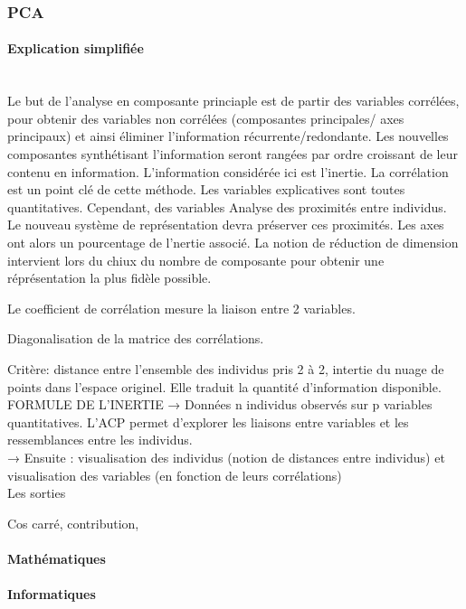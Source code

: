 \documentclass[12pt]{article}
\begin{document}
\subsubsection{PCA}

\paragraph{Explication simplifiée}\mbox{}\\

Le but de l'analyse en composante princiaple est de partir des variables corrélées, pour obtenir des variables non corrélées (composantes principales/ axes principaux) et ainsi éliminer l’information récurrente/redondante. Les nouvelles composantes synthétisant l'information seront rangées par ordre croissant de leur contenu en information. L'information considérée ici est l'inertie.
La corrélation est un point clé de cette méthode.
Les variables explicatives sont toutes quantitatives. Cependant, des variables 
Analyse des proximités entre individus. Le nouveau système de représentation devra préserver ces proximités.
Les axes ont alors un pourcentage de l'nertie associé.
La notion de réduction de dimension intervient lors du chiux du nombre de composante pour obtenir une réprésentation la plus fidèle possible.

Le coefficient de corrélation mesure la liaison entre 2 variables.

Diagonalisation de la matrice des corrélations.

Critère: distance entre l'ensemble des individus pris 2 à 2, intertie du nuage de points dans l'espace originel. Elle traduit la quantité d'information disponible.
FORMULE DE L'INERTIE
→ Données n individus observés sur p variables quantitatives. L’ACP permet d’explorer les liaisons entre variables et les ressemblances entre les individus.\\
→ Ensuite : visualisation des individus (notion de distances entre individus) et visualisation des variables (en fonction de leurs corrélations)\\

Les sorties

Cos carré, contribution, 
\paragraph{Mathématiques}
\paragraph{Informatiques}
\end{document}

